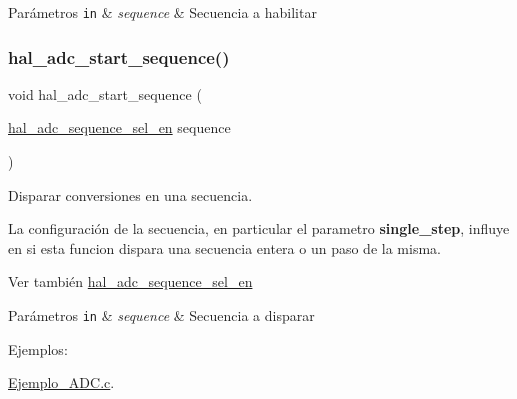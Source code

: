 \begin{DoxyParams}[1]{Parámetros}
\mbox{\tt in}  & {\em sequence} & Secuencia a habilitar \\
\hline
\end{DoxyParams}
\mbox{\label{group__ADC_ga154950a81b5f589fde0139178ab1dcf3}} 
\subsubsection{\texorpdfstring{hal\+\_\+adc\+\_\+start\+\_\+sequence()}{hal\_adc\_start\_sequence()}}
{\footnotesize\ttfamily void hal\+\_\+adc\+\_\+start\+\_\+sequence (\begin{DoxyParamCaption}\item[{\hyperlink{group__ADC_ga9297d7b14d7018a94bce94f0103d8559}{hal\+\_\+adc\+\_\+sequence\+\_\+sel\+\_\+en}}]{sequence }\end{DoxyParamCaption})}



Disparar conversiones en una secuencia. 

La configuración de la secuencia, en particular el parametro {\bfseries single\+\_\+step}, influye en si esta funcion dispara una secuencia entera o un paso de la misma.

\begin{DoxySeeAlso}{Ver también}
\hyperlink{group__ADC_ga9297d7b14d7018a94bce94f0103d8559}{hal\+\_\+adc\+\_\+sequence\+\_\+sel\+\_\+en} 
\end{DoxySeeAlso}

\begin{DoxyParams}[1]{Parámetros}
\mbox{\tt in}  & {\em sequence} & Secuencia a disparar \\
\hline
\end{DoxyParams}
\begin{Desc}
\item[Ejemplos\+: ]\par
\hyperlink{Ejemplo_ADC_8c-example}{Ejemplo\+\_\+\+A\+D\+C.\+c}.\end{Desc}
\mbox{\label{group__ADC_gaf58fbae95e4083bddf74495df7709674}} 

